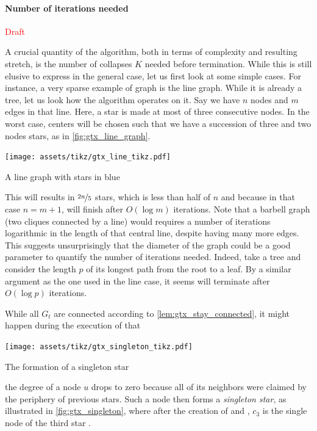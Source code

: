 \paragraph{Number of iterations needed}\label{par:number_of_iteration}%

\textcolor{red}{\LARGE Draft}

A crucial quantity of the \gtx{} algorithm, both in terms of complexity and resulting stretch, is
the number of collapses $K$ needed before termination. While this is still elusive to express in the
general case, let us first look at some simple cases. For instance, a very sparse example of graph
is the line graph. While it is already a tree, let us look how the \gtx{} algorithm operates on it.
Say we have $n$ nodes and $m$ edges in that line. Here, a star is made at most of three
consecutive nodes. In the worst case, centers will be chosen such that we have a succession of three
and two nodes stars, as in \autoref{fig:gtx_line_graph}.%
\begin{marginfigure}
  \centering
  \texttt{[image: assets/tikz/gtx\_line\_tikz.pdf]}
  \caption{A line graph with stars in blue}
  \label{fig:gtx_line_graph}
\end{marginfigure}
This will results in $\nicefrac{2n}{5}$ stars, which is less than half of $n$ and because in that
case $n=m+1$, \gtx{} will finish after $O(\log m)$ iterations. Note that a barbell graph (two
cliques connected by a line) would requires a number of iterations logarithmic in the length of that
central line, despite having many more edges. This suggests unsurprisingly that the diameter of the graph
could be a good parameter to quantify the number of iterations needed. Indeed, take a tree and consider
the length $p$ of its longest path from the root to a leaf. By a similar argument as the one used in
the line case, it seems \gtx{} will terminate after $O(\log p)$ iterations.

While all $G_t$ are connected according to \autoref{lem:gtx_stay_connected}, it might happen during
the execution of \extractStar{} that%
\begin{marginfigure}
  \centering
  \texttt{[image: assets/tikz/gtx\_singleton\_tikz.pdf]}
  \caption{The formation of a singleton star}
  \label{fig:gtx_singleton}
\end{marginfigure}
the degree of a node $u$ drops to zero because all of its neighbors were claimed by the
periphery of previous stars. Such a node then forms a \emph{singleton star}, as illustrated in
\autoref{fig:gtx_singleton}, where after the creation of  and , $c_3$ is the
single node of the third star .

